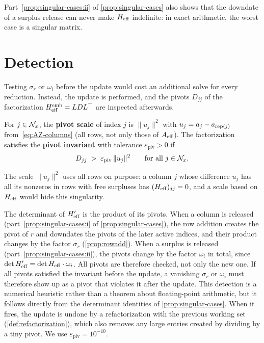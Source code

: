 Part~\ref{prop:singular-cases:ii} of \cref{prop:singular-cases} also shows that the downdate of a surplus release can never make $H_{\mathrm{eff}}$
indefinite: in exact arithmetic, the worst case is a singular matrix.


\section{Detection}
\label{sec:detection}

Testing $\sigma_r$ or $\omega_i$ before the update would cost an additional solve for every
reduction. Instead, the update is performed, and the pivots $D_{jj}$ of the factorization
$H_{\mathrm{eff}}^{\mathrm{emb}} = LDL^\top$ are inspected afterwards.

\begin{definition} \label{def:pivot-invariant}
For $j\in\mathcal{N}_x$, the \textbf{pivot scale} of index $j$ is $\lVert u_j\rVert^2$ with
$u_j = a_j - a_{\operatorname{rep}(j)}$ from~\eqref{eq:AZ-columns} (all rows, not only those of $A_{\mathrm{eff}}$). The
factorization satisfies the \textbf{pivot invariant} with tolerance $\varepsilon_{\mathrm{piv}}>0$ if
\[
D_{jj}\;>\;\varepsilon_{\mathrm{piv}}\,\lVert u_j\rVert^2\qquad\text{for all }j\in\mathcal{N}_x .
\]
\end{definition}

The scale $\lVert u_j\rVert^2$ uses all rows on purpose: a column $j$ whose difference $u_j$ has all
its nonzeros in rows with free surpluses has $(H_{\mathrm{eff}})_{jj} = 0$, and a scale based on $H_{\mathrm{eff}}$ would hide this
singularity.

The determinant of $H_{\mathrm{eff}}'$ is the product of its pivots. When a column is released (part~\ref{prop:singular-cases:i} of
\cref{prop:singular-cases}), the row addition creates the pivot of $r$ and downdates the pivots
of the later active indices, and their product changes by the factor $\sigma_r$
(\cref{prop:rowadd}). When a surplus is released (part~\ref{prop:singular-cases:ii}), the pivots change by the factor
$\omega_i$ in total, since $\det H_{\mathrm{eff}}' = \det H_{\mathrm{eff}}\cdot\omega_i$. All pivots are therefore checked,
not only the new one. If all pivots satisfied the invariant before the update, a
vanishing $\sigma_r$ or $\omega_i$ must therefore show up as a pivot that violates it after the
update. This detection is a numerical heuristic rather than a theorem about floating-point
arithmetic, but it follows directly from the determinant identities of
\cref{prop:singular-cases}. When it fires, the update is undone by a refactorization with the
previous working set (\cref{def:refactorization}), which also removes any large entries
created by dividing by a tiny pivot. We use $\varepsilon_{\mathrm{piv}} = 10^{-10}$.

